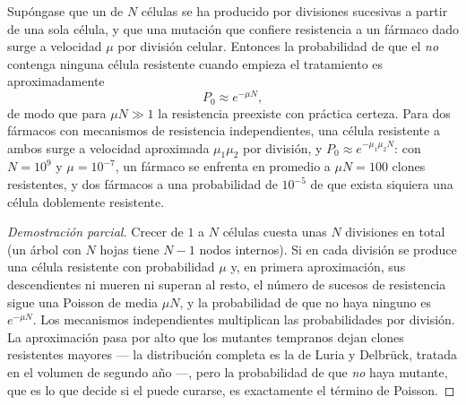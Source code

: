 \begin{theorem}\label{thm:b3:cancer-biology:goldie-coldman}
Supóngase que un  de $N$ células se ha producido por divisiones
sucesivas a partir de una sola célula, y que una mutación que confiere
resistencia a un fármaco dado surge a velocidad $\mu$ por división
celular. Entonces la probabilidad de que el  \emph{no} contenga
ninguna célula resistente cuando empieza el tratamiento es
aproximadamente
\[
P_{0} \approx e^{-\mu N},
\]
de modo que para $\mu N \gg 1$ la resistencia preexiste con práctica
certeza. Para dos fármacos con mecanismos de resistencia independientes,
una célula resistente a ambos surge a velocidad aproximada
$\mu_{1}\mu_{2}$ por división, y $P_{0}
\approx e^{-\mu_{1}\mu_{2}N}$: con $N = 10^{9}$ y $\mu = 10^{-7}$, un
fármaco se enfrenta en promedio a $\mu N = 100$ clones resistentes, y dos
fármacos a una probabilidad de $10^{-5}$ de que exista siquiera una
célula doblemente resistente.
\end{theorem}
\begin{proof}[Demostración parcial]
Crecer de $1$ a $N$ células cuesta unas $N$ divisiones en total (un árbol
con $N$ hojas tiene $N - 1$ nodos internos). Si en cada división se
produce una célula resistente con probabilidad $\mu$ y, en primera
aproximación, sus descendientes ni mueren ni superan al resto, el número
de sucesos de resistencia sigue una Poisson de media $\mu N$, y la
probabilidad de que no haya ninguno es $e^{-\mu N}$. Los mecanismos
independientes multiplican las probabilidades por división. La
aproximación pasa por alto que los mutantes tempranos dejan clones
resistentes mayores --- la distribución completa es la de Luria y
Delbrück, tratada en el volumen de segundo año ---, pero la probabilidad
de que \emph{no} haya mutante, que es lo que decide si el  puede
curarse, es exactamente el término de Poisson.
\end{proof}

